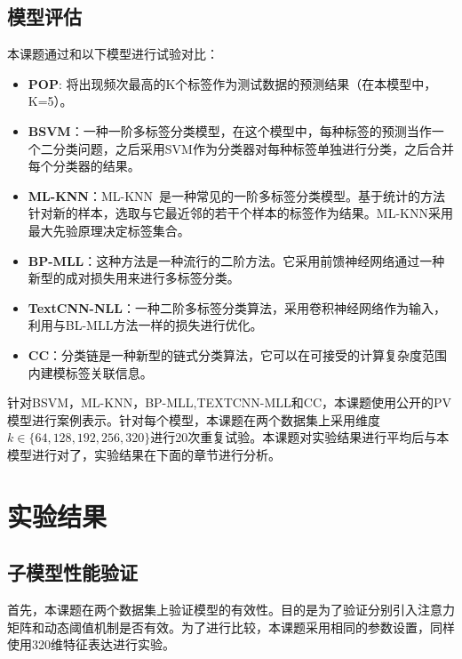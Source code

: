 \subsection{模型评估}
本课题通过和以下模型进行试验对比：
\begin{itemize}
    \item \textbf{POP}: 将出现频次最高的K个标签作为测试数据的预测结果（在本模型中，K=5）。
    \item \textbf{BSVM}：一种一阶多标签分类模型\cite{Elisseeff2001A}，在这个模型中，每种标签的预测当作一个二分类问题，之后采用SVM作为分类器对每种标签单独进行分类，之后合并每个分类器的结果。
    \item \textbf{ML-KNN}：ML-KNN~\cite{zhang2007ml}是一种常见的一阶多标签分类模型。基于统计的方法针对新的样本，选取与它最近邻的若干个样本的标签作为结果。ML-KNN采用最大先验原理决定标签集合。
    \item \textbf{BP-MLL}：这种方法\cite{zhang2006multilabel}是一种流行的二阶方法。它采用前馈神经网络通过一种新型的成对损失用来进行多标签分类。
    \item \textbf{TextCNN-NLL}：一种二阶多标签分类算法，采用卷积神经网络\cite{Kim14}作为输入，利用与BL-MLL方法一样的损失进行优化。
    \item \textbf{CC}：分类链\cite{ReadPHF11}是一种新型的链式分类算法，它可以在可接受的计算复杂度范围内建模标签关联信息。
\end{itemize}

针对BSVM，ML-KNN，BP-MLL,TEXTCNN-MLL和CC，本课题使用公开的PV模型\cite{le2014distributed}进行案例表示。针对每个模型，本课题在两个数据集上采用维度$k\in \{64,128,192,256,320\}$进行20次重复试验。本课题对实验结果进行平均后与本模型进行对了，实验结果在下面的章节进行分析。

\section{实验结果}
\label{sec:dpam_exper_result}
\subsection{子模型性能验证}
首先，本课题在两个数据集上验证模型的有效性。目的是为了验证分别引入注意力矩阵和动态阈值机制是否有效。为了进行比较，本课题采用相同的参数设置，同样使用320维特征表达进行实验。

